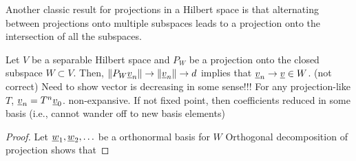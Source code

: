 Another classic result for projections in a Hilbert space is that alternating between projections onto multiple subspaces leads to a projection onto the intersection of all the subspaces.
\begin{lemma}
Let $V$ be a separable Hilbert space and $P_{W}$ be a projection onto the closed subspace $W\subset V$. Then, $\left\Vert P_{W}\underline v_{n}\right\Vert \rightarrow\left\Vert \underline v_{n}\right\Vert \rightarrow d$ implies that $\underline v_{n}\rightarrow\underline v\in W$. (not correct) Need to show vector is decreasing in some sense!!! For any projection-like $T$, $\underline v_{n}=T^{n}\underline v_{0}$. non-expansive. If not fixed point, then coefficients reduced in some basis (i.e., cannot wander off to new basis elements)
\end{lemma}
\begin{proof}
Let $\underline w_{1},\underline w_{2},\ldots$ be a orthonormal basis for $W$ Orthogonal decomposition of projection shows that
\end{proof}
\fi
